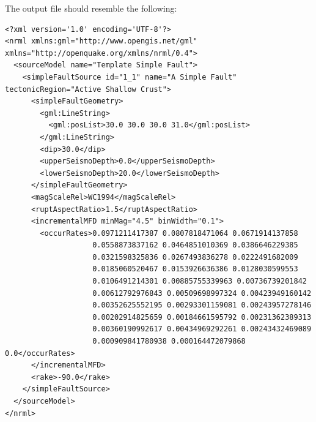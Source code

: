 The output file should resemble the following:

\begin{Verbatim}[frame=single, commandchars=\\\{\}, fontsize=\scriptsize]
<?xml version='1.0' encoding='UTF-8'?>
<nrml xmlns:gml="http://www.opengis.net/gml" xmlns="http://openquake.org/xmlns/nrml/0.4">
  <sourceModel name="Template Simple Fault">
    <simpleFaultSource id="1_1" name="A Simple Fault" tectonicRegion="Active Shallow Crust">
      <simpleFaultGeometry>
        <gml:LineString>
          <gml:posList>30.0 30.0 30.0 31.0</gml:posList>
        </gml:LineString>
        <dip>30.0</dip>
        <upperSeismoDepth>0.0</upperSeismoDepth>
        <lowerSeismoDepth>20.0</lowerSeismoDepth>
      </simpleFaultGeometry>
      <magScaleRel>WC1994</magScaleRel>
      <ruptAspectRatio>1.5</ruptAspectRatio>
      <incrementalMFD minMag="4.5" binWidth="0.1">
        <occurRates>0.0971211417387 0.0807818471064 0.0671914137858
                    0.0558873837162 0.0464851010369 0.0386646229385
                    0.0321598325836 0.0267493836278 0.0222491682009
                    0.0185060520467 0.0153926636386 0.0128030599553
                    0.0106491214301 0.00885755339963 0.00736739201842
                    0.00612792976843 0.00509698997324 0.00423949160142 
                    0.00352625552195 0.00293301159081 0.00243957278146
                    0.00202914825659 0.00184661595792 0.00231362389313
                    0.00360190992617 0.00434969292261 0.00243432469089
                    0.000909841780938 0.000164472079868 0.0</occurRates>
      </incrementalMFD>
      <rake>-90.0</rake>
    </simpleFaultSource>
  </sourceModel>
</nrml>
\end{Verbatim}

